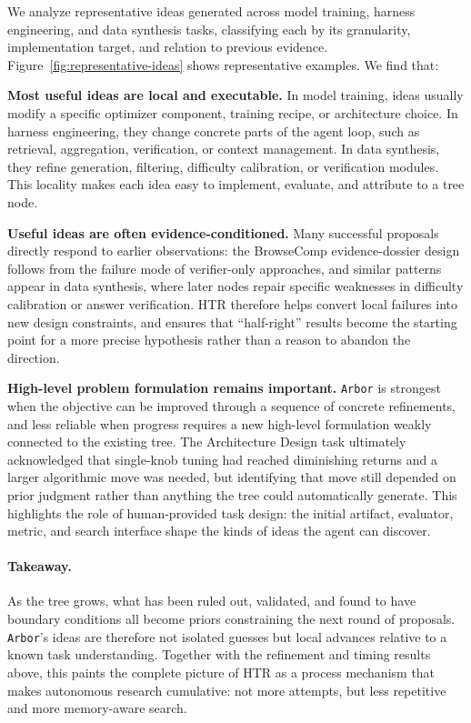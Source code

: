 \documentclass[]{selfevolagent}
\theoremstyle{plain}
\theoremstyle{definition}
\theoremstyle{remark}
\newcommand{\arbor}{\texttt{Arbor}}
\begin{document}
We analyze representative ideas generated across model training, harness engineering, and data synthesis tasks, classifying each by its granularity, implementation target, and relation to previous evidence. Figure~\ref{fig:representative-ideas} shows representative examples. We find that:
 
\textbf{Most useful ideas are local and executable.}
In model training, ideas usually modify a specific optimizer component, training recipe, or architecture choice. In harness engineering, they change concrete parts of the agent loop, such as retrieval, aggregation, verification, or context management. In data synthesis, they refine generation, filtering, difficulty calibration, or verification modules. This locality makes each idea easy to implement, evaluate, and attribute to a tree node.
 
\textbf{Useful ideas are often evidence-conditioned.}
Many successful proposals directly respond to earlier observations: the BrowseComp evidence-dossier design follows from the failure mode of verifier-only approaches, and similar patterns appear in data synthesis, where later nodes repair specific weaknesses in difficulty calibration or answer verification. HTR therefore helps convert local failures into new design constraints, and ensures that ``half-right'' results become the starting point for a more precise hypothesis rather than a reason to abandon the direction.
 
\textbf{High-level problem formulation remains important.}
\arbor{} is strongest when the objective can be improved through a sequence of concrete refinements, and less reliable when progress requires a new high-level formulation weakly connected to the existing tree. The Architecture Design task ultimately acknowledged that single-knob tuning had reached diminishing returns and a larger algorithmic move was needed, but identifying that move still depended on prior judgment rather than anything the tree could automatically generate. This highlights the role of human-provided task design: the initial artifact, evaluator, metric, and search interface shape the kinds of ideas the agent can discover.
 
\paragraph{Takeaway.}
As the tree grows, what has been ruled out, validated, and found to have boundary conditions all become priors constraining the next round of proposals.
\arbor{}'s ideas are therefore not isolated guesses but local advances relative to a known task understanding. Together with the refinement and timing results above, this paints the complete picture of HTR as a process mechanism that makes autonomous research cumulative: not more attempts, but less repetitive and more memory-aware search.
 
\end{document}
